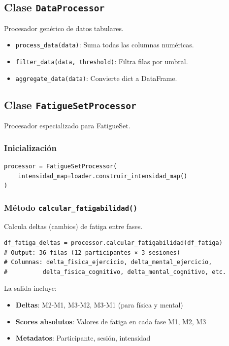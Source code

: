 \documentclass[12pt,a4paper]{article}
\begin{document}
\subsection{Clase \texttt{DataProcessor}}

Procesador genérico de datos tabulares.

\begin{itemize}
    \item \texttt{process\_data(data)}: Suma todas las columnas numéricas.
    \item \texttt{filter\_data(data, threshold)}: Filtra filas por umbral.
    \item \texttt{aggregate\_data(data)}: Convierte dict a DataFrame.
\end{itemize}

\subsection{Clase \texttt{FatigueSetProcessor}}

Procesador especializado para FatigueSet.

\subsubsection{Inicialización}

\begin{lstlisting}
processor = FatigueSetProcessor(
    intensidad_map=loader.construir_intensidad_map()
)
\end{lstlisting}

\subsubsection{Método \texttt{calcular\_fatigabilidad()}}

Calcula deltas (cambios) de fatiga entre fases.

\begin{lstlisting}
df_fatiga_deltas = processor.calcular_fatigabilidad(df_fatiga)
# Output: 36 filas (12 participantes × 3 sesiones)
# Columnas: delta_fisica_ejercicio, delta_mental_ejercicio,
#          delta_fisica_cognitivo, delta_mental_cognitivo, etc.
\end{lstlisting}

La salida incluye:
\begin{itemize}
    \item \textbf{Deltas}: M2-M1, M3-M2, M3-M1 (para física y mental)
    \item \textbf{Scores absolutos}: Valores de fatiga en cada fase M1, M2, M3
    \item \textbf{Metadatos}: Participante, sesión, intensidad
\end{itemize}
\end{document}
